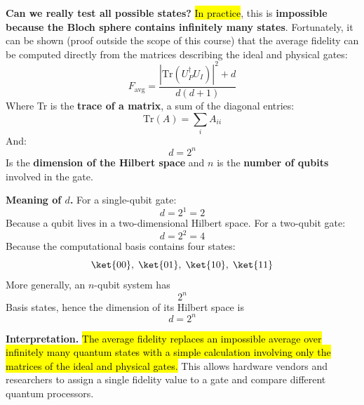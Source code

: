 \highspace
\textcolor{Green3}{ \textbf{Can we really test all possible states?}} \hl{In practice}, this is \textbf{impossible because the Bloch sphere contains infinitely many states}. Fortunately, it can be shown (proof outside the scope of this course) that the average fidelity can be computed directly from the matrices describing the ideal and physical gates:
\begin{equation}\label{eq:average-fidelity}
    F_{\text{avg}}
    =
    \frac{
        \left|
        \mathrm{Tr}
        \left(
            U_P^{\dagger}U_I
        \right)
        \right|^2
        + d
    }
    {
        d(d+1)
    }
\end{equation}
Where Tr is the \textbf{trace of a matrix}, a sum of the diagonal entries:
\begin{equation*}
    \mathrm{Tr}(A) = \sum_i A_{ii}
\end{equation*}
And:
\begin{equation*}
    d = 2^n
\end{equation*}
Is the \textbf{dimension of the Hilbert space} and $n$ is the \textbf{number of qubits} involved in the gate.

\highspace
\textcolor{Green3}{ \textbf{Meaning of $d$.}} For a single-qubit gate:
\begin{equation*}
    d = 2^1 = 2
\end{equation*}
Because a qubit lives in a two-dimensional Hilbert space. For a two-qubit gate:
\begin{equation*}
    d = 2^2 = 4
\end{equation*}
Because the computational basis contains four states:
\begin{equation*}
    \ket{00},\;
    \ket{01},\;
    \ket{10},\;
    \ket{11}
\end{equation*}
More generally, an $n$-qubit system has
\begin{equation*}
    2^n
\end{equation*}
Basis states, hence the dimension of its Hilbert space is
\begin{equation*}
    d = 2^n
\end{equation*}

\highspace
\textcolor{Green3}{ \textbf{Interpretation.}} \hl{The average fidelity replaces an impossible average over infinitely many quantum states with a simple calculation involving only the matrices of the ideal and physical gates.} This allows hardware vendors and researchers to assign a single fidelity value to a gate and compare different quantum processors.